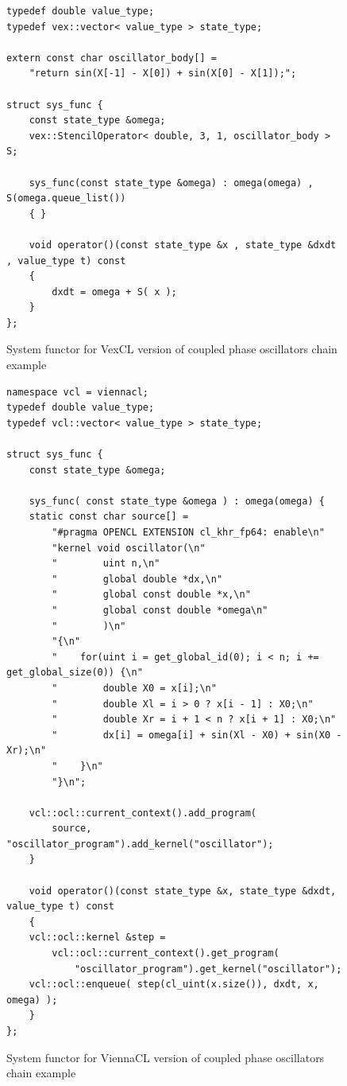 \documentclass[1p]{elsarticle}
\begin{document}
\begin{figure}
\begin{lstlisting}
typedef double value_type;
typedef vex::vector< value_type > state_type;

extern const char oscillator_body[] =
    "return sin(X[-1] - X[0]) + sin(X[0] - X[1]);";

struct sys_func {
    const state_type &omega;
    vex::StencilOperator< double, 3, 1, oscillator_body > S;

    sys_func(const state_type &omega) : omega(omega) , S(omega.queue_list())
    { }

    void operator()(const state_type &x , state_type &dxdt , value_type t) const
    {
        dxdt = omega + S( x );
    }
};
\end{lstlisting}
\caption{System functor for VexCL version of coupled phase oscillators chain
example}
\label{code:vexcl:phase}
\end{figure}

\begin{figure}
\begin{lstlisting}
namespace vcl = viennacl;
typedef double value_type;
typedef vcl::vector< value_type > state_type;

struct sys_func {
    const state_type &omega;

    sys_func( const state_type &omega ) : omega(omega) {
	static const char source[] =
	    "#pragma OPENCL EXTENSION cl_khr_fp64: enable\n"
	    "kernel void oscillator(\n"
	    "        uint n,\n"
	    "        global double *dx,\n"
	    "        global const double *x,\n"
	    "        global const double *omega\n"
	    "        )\n"
	    "{\n"
	    "    for(uint i = get_global_id(0); i < n; i += get_global_size(0)) {\n"
	    "        double X0 = x[i];\n"
	    "        double Xl = i > 0 ? x[i - 1] : X0;\n"
	    "        double Xr = i + 1 < n ? x[i + 1] : X0;\n"
	    "        dx[i] = omega[i] + sin(Xl - X0) + sin(X0 - Xr);\n"
	    "    }\n"
	    "}\n";

	vcl::ocl::current_context().add_program(
		source, "oscillator_program").add_kernel("oscillator");
    }

    void operator()(const state_type &x, state_type &dxdt, value_type t) const
    {
	vcl::ocl::kernel &step =
	    vcl::ocl::current_context().get_program(
		    "oscillator_program").get_kernel("oscillator");
	vcl::ocl::enqueue( step(cl_uint(x.size()), dxdt, x, omega) );
    }
};
\end{lstlisting}
\caption{System functor for ViennaCL version of coupled phase oscillators chain
example}
\label{code:viennacl:phase}
\end{figure}
\end{document}
